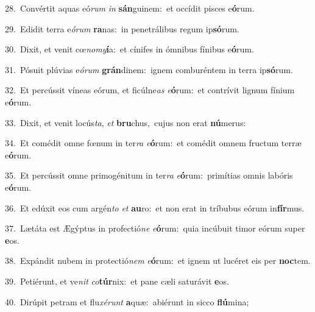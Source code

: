 {\numbfont\textcolor{\numbcolor}{28.}}~Convértit aquas eó\textit{rum} \textit{in} \textbf{sán}\-guinem:~\star et occídit pisces e\-\textbf{ó}\-rum.\par
{\numbfont\textcolor{\numbcolor}{29.}}~Edidit terra e\-\textit{ó}\-\textit{rum} \textbf{ra}\-nas:~\star in penetrálibus regum ip\-\textbf{só}\-rum.\par
{\numbfont\textcolor{\numbcolor}{30.}}~Dixit, et venit cœ\-\textit{no}\-\textit{my}\textbf{í}a:~\star et cínifes in ómnibus fínibus e\-\textbf{ó}\-rum.\par
{\numbfont\textcolor{\numbcolor}{31.}}~Pósuit plúvias e\-\textit{ó}\-\textit{rum} \textbf{grán}\-dinem:~\star ignem comburéntem in terra ip\-\textbf{só}\-rum.\par
{\numbfont\textcolor{\numbcolor}{32.}}~Et percússit víneas eórum, et ficúlne\textit{as} \textit{e}\-\textbf{ó}rum:~\star et contrívit lignum fínium e\-\textbf{ó}\-rum.\par
{\numbfont\textcolor{\numbcolor}{33.}}~Dixit, et venit locús\-\textit{ta}\-, \textit{et} \textbf{bru}\-chus,~\star cujus non erat \textbf{nú}\-merus:\par
{\numbfont\textcolor{\numbcolor}{34.}}~Et comédit omne fœnum in ter\textit{ra} \textit{e}\-\textbf{ó}rum:~\star et comédit omnem fructum terræ e\-\textbf{ó}\-rum.\par
{\numbfont\textcolor{\numbcolor}{35.}}~Et percússit omne primogénitum in ter\textit{ra} \textit{e}\-\textbf{ó}rum:~\star primítias omnis labóris e\-\textbf{ó}\-rum.\par
{\numbfont\textcolor{\numbcolor}{36.}}~Et edúxit eos cum argén\textit{to} \textit{et} \textbf{au}\-ro:~\star et non erat in tríbubus eórum in\-\textbf{fír}\-mus.\par
{\numbfont\textcolor{\numbcolor}{37.}}~Lætáta est Ægýptus in profectió\textit{ne} \textit{e}\-\textbf{ó}rum:~\star quia incúbuit timor eórum super \textbf{e}\-os.\par
{\numbfont\textcolor{\numbcolor}{38.}}~Expándit nubem in protectió\textit{nem} \textit{e}\-\textbf{ó}rum:~\star et ignem ut lucéret eis per \textbf{noc}\-tem.\par
{\numbfont\textcolor{\numbcolor}{39.}}~Petiérunt, et ve\textit{nit} \textit{co}\-\textbf{túr}nix:~\star et pane cæli saturávit \textbf{e}\-os.\par
{\numbfont\textcolor{\numbcolor}{40.}}~Dirúpit petram et flu\-\textit{xé}\-\textit{runt} \textbf{a}\-quæ:~\star abiérunt in sicco \textbf{flú}\-mina;\par
